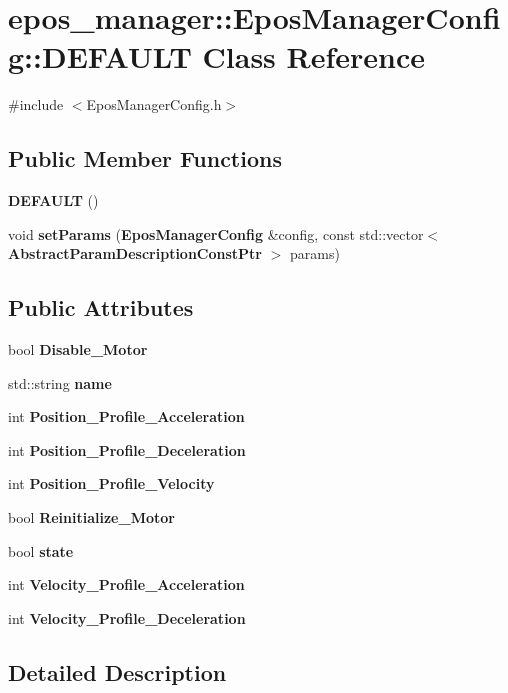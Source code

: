 \section{epos\-\_\-manager\-:\-:\-Epos\-Manager\-Config\-:\-:\-D\-E\-F\-A\-U\-L\-T \-Class \-Reference}
\label{classepos__manager_1_1EposManagerConfig_1_1DEFAULT}


{\ttfamily \#include $<$\-Epos\-Manager\-Config.\-h$>$}

\subsection*{\-Public \-Member \-Functions}
\begin{DoxyCompactItemize}
\item 
{\bf \-D\-E\-F\-A\-U\-L\-T} ()
\item 
void {\bf set\-Params} ({\bf \-Epos\-Manager\-Config} \&config, const std\-::vector$<$ {\bf \-Abstract\-Param\-Description\-Const\-Ptr} $>$ params)
\end{DoxyCompactItemize}
\subsection*{\-Public \-Attributes}
\begin{DoxyCompactItemize}
\item 
bool {\bf \-Disable\-\_\-\-Motor}
\item 
std\-::string {\bf name}
\item 
int {\bf \-Position\-\_\-\-Profile\-\_\-\-Acceleration}
\item 
int {\bf \-Position\-\_\-\-Profile\-\_\-\-Deceleration}
\item 
int {\bf \-Position\-\_\-\-Profile\-\_\-\-Velocity}
\item 
bool {\bf \-Reinitialize\-\_\-\-Motor}
\item 
bool {\bf state}
\item 
int {\bf \-Velocity\-\_\-\-Profile\-\_\-\-Acceleration}
\item 
int {\bf \-Velocity\-\_\-\-Profile\-\_\-\-Deceleration}
\end{DoxyCompactItemize}


\subsection{\-Detailed \-Description}


